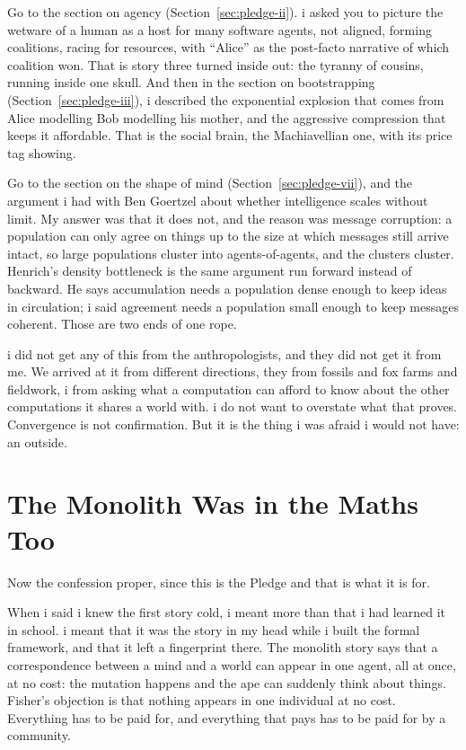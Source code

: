 Go to the section on agency (Section~\ref{sec:pledge-ii}). i asked you to picture the wetware of a human as a host for many software agents, not aligned, forming coalitions, racing for resources, with ``Alice'' as the post-facto narrative of which coalition won. That is story three turned inside out: the tyranny of cousins, running inside one skull. And then in the section on bootstrapping (Section~\ref{sec:pledge-iii}), i described the exponential explosion that comes from Alice modelling Bob modelling his mother, and the aggressive compression that keeps it affordable. That is the social brain, the Machiavellian one, with its price tag showing.

Go to the section on the shape of mind (Section~\ref{sec:pledge-vii}), and the argument i had with Ben Goertzel about whether intelligence scales without limit. My answer was that it does not, and the reason was message corruption: a population can only agree on things up to the size at which messages still arrive intact, so large populations cluster into agents-of-agents, and the clusters cluster. Henrich's density bottleneck is the same argument run forward instead of backward. He says accumulation needs a population dense enough to keep ideas in circulation; i said agreement needs a population small enough to keep messages coherent. Those are two ends of one rope.

i did not get any of this from the anthropologists, and they did not get it from me. We arrived at it from different directions, they from fossils and fox farms and fieldwork, i from asking what a computation can afford to know about the other computations it shares a world with. i do not want to overstate what that proves. Convergence is not confirmation. But it is the thing i was afraid i would not have: an outside.

\section{The Monolith Was in the Maths Too}

Now the confession proper, since this is the Pledge and that is what it is for.

When i said i knew the first story cold, i meant more than that i had learned it in school. i meant that it was the story in my head while i built the formal framework, and that it left a fingerprint there. The monolith story says that a correspondence between a mind and a world can appear in one agent, all at once, at no cost: the mutation happens and the ape can suddenly think about things. Fisher's objection is that nothing appears in one individual at no cost. Everything has to be paid for, and everything that pays has to be paid for by a community.

